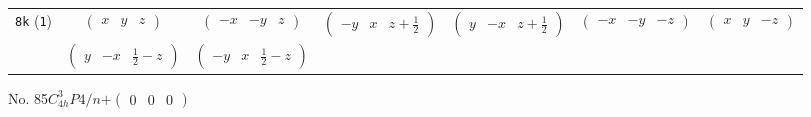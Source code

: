 \documentclass[fleqn,9pt,landscape]{jsarticle}
\begin{document}
\begin{center}
\begin{longtable}{ccccccc}
{\tt 8k} ({\tt 1}) & $ \begin{pmatrix} x & y & z \end{pmatrix} $ & $ \begin{pmatrix} - x & - y & z \end{pmatrix} $ & $ \begin{pmatrix} - y & x & z + \frac{1}{2} \end{pmatrix} $ & $ \begin{pmatrix} y & - x & z + \frac{1}{2} \end{pmatrix} $ & $ \begin{pmatrix} - x & - y & - z \end{pmatrix} $ & $ \begin{pmatrix} x & y & - z \end{pmatrix} $ \\
& $ \begin{pmatrix} y & - x & \frac{1}{2} - z \end{pmatrix} $ & $ \begin{pmatrix} - y & x & \frac{1}{2} - z \end{pmatrix} $ & $  $ & $  $ & $  $ & $  $ \\
\end{longtable}
\end{center}
\newpage
No. 85\quad$C_{4h}^{3}$\quad$P4/n$\quad[ tetragonal ]\quad$+\begin{pmatrix} 0 & 0 & 0 \end{pmatrix}$
\end{document}

